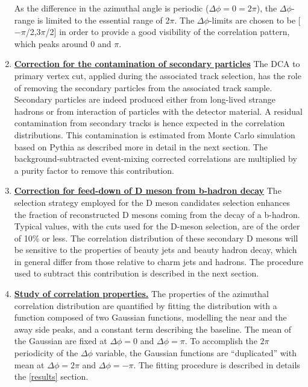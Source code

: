 \begin{enumerate}
As the difference in the azimuthal angle is periodic ($\Delta \phi = 0 = 2\pi$), the $\Delta\phi$-range is limited to the essential range of 2$\pi$. The $\Delta \phi$-limits are chosen to be [$-\pi$/2,3$\pi$/2] in order to provide a good visibility of the correlation pattern, which peaks around 0 and $\pi$.

\item
\underline {\bf Correction for the contamination of secondary particles}
The DCA to primary vertex cut, applied during the associated track selection, has the role of removing the secondary particles from the associated track sample.
Secondary particles are indeed produced either from long-lived strange hadrons or from interaction of particles with the detector material. A residual contamination from secondary tracks is hence expected in the correlation distributions. This contamination is estimated from Monte Carlo simulation
based on Pythia as described more in detail in the next section. The background-subtracted
event-mixing corrected correlations are multiplied by a purity factor to remove this contribution.

\item
\underline {\bf Correction for feed-down of D meson from b-hadron decay}
The selection strategy employed for the D meson candidates selection %
enhances the fraction of reconstructed D mesons coming from the decay of a b-hadron. Typical values, with the cuts used for the D-meson selection, are of the order of 10\% or less. The correlation distribution of these secondary D mesons will be sensitive to the properties of beauty jets and beauty hadron decay, which in general differ from those relative to charm jets and hadrons. The procedure used to subtract this contribution is described in the next section.

\item
\underline{\bf Study of correlation properties.}
The properties of the azimuthal correlation distribution are quantified by
fitting the distribution with a function composed of two Gaussian functions, modelling the near and the away side peaks, and
a constant term describing the baseline. The mean of the Gaussian are fixed at
$\Delta\phi = 0$ and $\Delta\phi = \pi$. To accomplish the $2\pi$ periodicity
of the $\Delta\phi$ variable, the Gaussian functions
are ``duplicated'' with mean at $\Delta\phi = 2\pi$ and $\Delta\phi = -\pi$.
The fitting procedure is described in details the \ref{results} section.



\end{enumerate}
